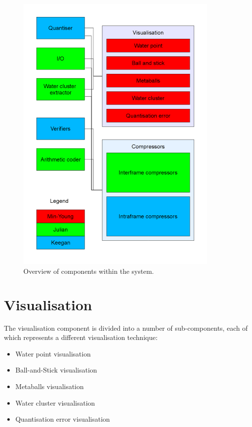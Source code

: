 \begin{figure}[h!]
  \begin{center}
    \includegraphics[width=100mm]{breakdown}
  \end{center}
  \caption{Overview of components within the system.}
  \label{fig:design_overview}
\end{figure}


\section{Visualisation}
\label{sec:design_visualisation}


The visualisation component is divided into a number of sub-components, each of
which represents a different visualisation technique:

\begin{itemize}
  \item Water point visualisation
  \item Ball-and-Stick visualisation
  \item Metaballs visualisation
  \item Water cluster visualisation
  \item Quantisation error visualisation
\end{itemize}

